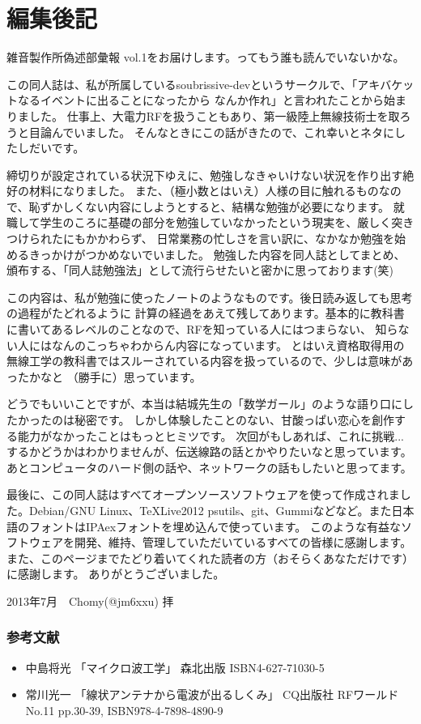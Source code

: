 \chapter*{編集後記}
雑音製作所偽述部彙報 vol.1をお届けします。ってもう誰も読んでいないかな。

この同人誌は、私が所属しているsoubrissive-devというサークルで、「アキバケットなるイベントに出ることになったから
なんか作れ」と言われたことから始まりました。
仕事上、大電力RFを扱うこともあり、第一級陸上無線技術士を取ろうと目論んでいました。
そんなときにこの話がきたので、これ幸いとネタにしたしだいです。

締切りが設定されている状況下ゆえに、勉強しなきゃいけない状況を作り出す絶好の材料になりました。
また、（極小数とはいえ）人様の目に触れるものなので、恥ずかしくない内容にしようとすると、結構な勉強が必要になります。
就職して学生のころに基礎の部分を勉強していなかったという現実を、厳しく突きつけられたにもかかわらず、
日常業務の忙しさを言い訳に、なかなか勉強を始めるきっかけがつかめないでいました。
勉強した内容を同人誌としてまとめ、頒布する、「同人誌勉強法」として流行らせたいと密かに思っております(笑)

この内容は、私が勉強に使ったノートのようなものです。後日読み返しても思考の過程がたどれるように
計算の経過をあえて残してあります。基本的に教科書に書いてあるレベルのことなので、RFを知っている人にはつまらない、
知らない人にはなんのこっちゃわからん内容になっています。
とはいえ資格取得用の無線工学の教科書ではスルーされている内容を扱っているので、少しは意味があったかなと
（勝手に）思っています。

どうでもいいことですが、本当は結城先生の「数学ガール」のような語り口にしたかったのは秘密です。
しかし体験したことのない、甘酸っぱい恋心を創作する能力がなかったことはもっとヒミツです。
次回がもしあれば、これに挑戦...するかどうかはわかりませんが、伝送線路の話とかやりたいなと思っています。
あとコンピュータのハード側の話や、ネットワークの話もしたいと思ってます。

最後に、この同人誌はすべてオープンソースソフトウェアを使って作成されました。Debian/GNU Linux、\TeX Live2012
psutils、git、Gummiなどなど。また日本語のフォントはIPAexフォントを埋め込んで使っています。
このような有益なソフトウェアを開発、維持、管理していただいているすべての皆様に感謝します。
また、このページまでたどり着いてくれた読者の方（おそらくあなただけです）に感謝します。
ありがとうございました。

\begin{flushright}
2013年7月　Chomy(@jm6xxu) 拝
\end{flushright}

\subsection*{参考文献}
\begin{itemize}
  \item 中島将光
    「マイクロ波工学」 森北出版 ISBN4-627-71030-5
  \item 常川光一
    「線状アンテナから電波が出るしくみ」 CQ出版社 RFワールド No.11 pp.30-39, ISBN978-4-7898-4890-9
\end{itemize}